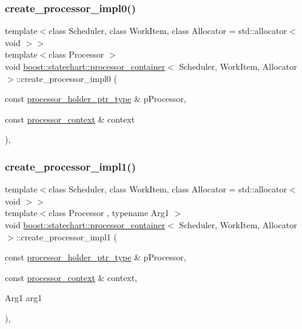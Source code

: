 \subsubsection{\texorpdfstring{create\+\_\+processor\+\_\+impl0()}{create\_processor\_impl0()}}
{\footnotesize\ttfamily template$<$class Scheduler, class Work\+Item, class Allocator = std\+::allocator$<$ void $>$$>$ \\
template$<$class Processor $>$ \\
void \mbox{\hyperlink{classboost_1_1statechart_1_1processor__container}{boost\+::statechart\+::processor\+\_\+container}}$<$ Scheduler, Work\+Item, Allocator $>$\+::create\+\_\+processor\+\_\+impl0 (\begin{DoxyParamCaption}\item[{const \mbox{\hyperlink{classboost_1_1statechart_1_1processor__container_a885e5a42694857bfaa44ec053ed20a57}{processor\+\_\+holder\+\_\+ptr\+\_\+type}} \&}]{p\+Processor,  }\item[{const \mbox{\hyperlink{classboost_1_1statechart_1_1processor__container_1_1processor__context}{processor\+\_\+context}} \&}]{context }\end{DoxyParamCaption})\hspace{0.3cm}{\ttfamily [inline]}, {\ttfamily [private]}}

\mbox{\label{classboost_1_1statechart_1_1processor__container_aa71e924b6ff8927f6227a79fa1b9eaff}} 
\subsubsection{\texorpdfstring{create\+\_\+processor\+\_\+impl1()}{create\_processor\_impl1()}}
{\footnotesize\ttfamily template$<$class Scheduler, class Work\+Item, class Allocator = std\+::allocator$<$ void $>$$>$ \\
template$<$class Processor , typename Arg1 $>$ \\
void \mbox{\hyperlink{classboost_1_1statechart_1_1processor__container}{boost\+::statechart\+::processor\+\_\+container}}$<$ Scheduler, Work\+Item, Allocator $>$\+::create\+\_\+processor\+\_\+impl1 (\begin{DoxyParamCaption}\item[{const \mbox{\hyperlink{classboost_1_1statechart_1_1processor__container_a885e5a42694857bfaa44ec053ed20a57}{processor\+\_\+holder\+\_\+ptr\+\_\+type}} \&}]{p\+Processor,  }\item[{const \mbox{\hyperlink{classboost_1_1statechart_1_1processor__container_1_1processor__context}{processor\+\_\+context}} \&}]{context,  }\item[{Arg1}]{arg1 }\end{DoxyParamCaption})\hspace{0.3cm}{\ttfamily [inline]}, {\ttfamily [private]}}

